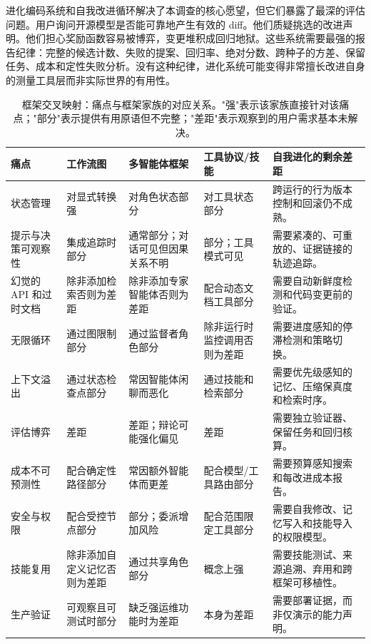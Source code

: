 进化编码系统和自我改进循环解决了本调查的核心愿望，但它们暴露了最深的评估问题。用户询问开源模型是否能可靠地产生有效的 diff。他们质疑挑选的改进声明。他们担心奖励函数容易被博弈，变更堆积成回归地狱。这些系统需要最强的报告纪律：完整的候选计数、失败的提案、回归率、绝对分数、跨种子的方差、保留任务、成本和定性失败分析。没有这种纪律，进化系统可能变得非常擅长改进自身的测量工具层而非实际世界的有用性。

\begin{table}[t]
\centering
\scriptsize
\setlength{\tabcolsep}{2pt}
\renewcommand{\arraystretch}{1.08}
\caption{框架交叉映射：痛点与框架家族的对应关系。"强"表示该家族直接针对该痛点；"部分"表示提供有用原语但不完整；"差距"表示观察到的用户需求基本未解决。}
\label{tab:framework-crosswalk}
\begin{tabularx}{\textwidth}{@{}L{0.18\textwidth}L{0.16\textwidth}L{0.16\textwidth}L{0.16\textwidth}Y@{}}
\toprule
\textbf{痛点} & \textbf{工作流图} & \textbf{多智能体框架} & \textbf{工具协议/技能} & \textbf{自我进化的剩余差距} \\
\midrule
状态管理 & 对显式转换强 & 对角色状态部分 & 对工具状态部分 & 跨运行的行为版本控制和回滚仍不成熟。 \\
提示与决策可观察性 & 集成追踪时部分 & 通常部分；对话可见但因果关系不明 & 部分；工具模式可见 & 需要紧凑的、可重放的、证据链接的轨迹追踪。 \\
幻觉的 API 和过时文档 & 除非添加检索否则为差距 & 除非添加专家智能体否则为差距 & 配合动态文档工具部分 & 需要自动新鲜度检测和代码变更前的验证。 \\
无限循环 & 通过图限制部分 & 通过监督者角色部分 & 除非运行时监控调用否则为差距 & 需要进度感知的停滞检测和策略切换。 \\
上下文溢出 & 通过状态检查点部分 & 常因智能体闲聊而恶化 & 通过技能和检索部分 & 需要优先级感知的记忆、压缩保真度和检索时序。 \\
评估博弈 & 差距 & 差距；辩论可能强化偏见 & 差距 & 需要独立验证器、保留任务和回归核算。 \\
成本不可预测性 & 配合确定性路径部分 & 常因额外智能体而更差 & 配合模型/工具路由部分 & 需要预算感知搜索和每改进成本报告。 \\
安全与权限 & 配合受控节点部分 & 部分；委派增加风险 & 配合范围限定工具部分 & 需要自我修改、记忆写入和技能导入的权限模型。 \\
技能复用 & 除非添加自定义记忆否则为差距 & 通过共享角色部分 & 概念上强 & 需要技能测试、来源追溯、弃用和跨框架可移植性。 \\
生产验证 & 可观察且可测试时部分 & 缺乏强运维功能时为差距 & 本身为差距 & 需要部署证据，而非仅演示的能力声明。 \\
\bottomrule
\end{tabularx}
\end{table}

